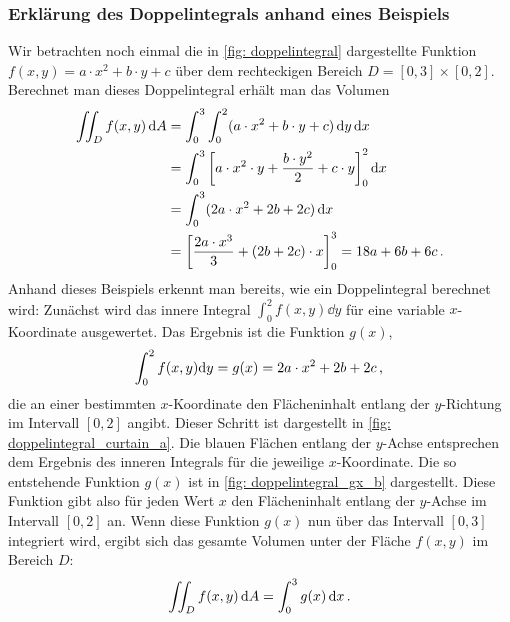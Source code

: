 \subsubsection{Erklärung des Doppelintegrals anhand eines Beispiels}\label{subsubsec: erklaerung_doppelintegral}
Wir betrachten noch einmal die in \cref{fig: doppelintegral} dargestellte Funktion $f(x,y) = a\cdot x^2 + b\cdot y + c$ über dem rechteckigen Bereich $D = [0,3] \times [0,2]$. Berechnet man dieses Doppelintegral erhält man das Volumen 
\begin{align*}
    \iint_{D} f(x,y) \,\mathrm{d} A &= \int_{0}^{3} \int_{0}^{2} (a\cdot x^2 + b\cdot y + c) \,\mathrm{d} y \,\mathrm{d} x \\
    &= \int_{0}^{3} \left[ a\cdot x^2 \cdot y + \frac{b\cdot y^2}{2} + c\cdot y \right]_{0}^{2} \mathrm{d} x \\
    &= \int_{0}^{3} (2a\cdot x^2 + 2b + 2c) \,\mathrm{d} x \\
    &= \left[ \frac{2a\cdot x^3}{3} + (2b + 2c)\cdot x \right]_{0}^{3} = 18a + 6b + 6c \,.
\end{align*}
Anhand dieses Beispiels erkennt man bereits, wie ein Doppelintegral berechnet wird: Zunächst wird das innere Integral $\int_{0}^{2} f(x,y) \dd y$ für eine variable $x$-Koordinate ausgewertet. Das Ergebnis ist die Funktion $g(x)$, 
\begin{equation}
    \int_{0}^{2} f(x,y) \mathrm{d} y = g(x) = 2a \cdot x^2 + 2b + 2c \,{,}\,
\end{equation} 
die an einer bestimmten $x$-Koordinate den Flächeninhalt entlang der $y$-Richtung im Intervall $[0,2]$ angibt. Dieser Schritt ist dargestellt in \cref{fig: doppelintegral_curtain_a}. Die blauen Flächen entlang der $y$-Achse entsprechen dem Ergebnis des inneren Integrals für die jeweilige $x$-Koordinate. Die so entstehende Funktion $g(x)$ ist in \cref{fig: doppelintegral_gx_b} dargestellt. Diese Funktion gibt also für jeden Wert $x$ den Flächeninhalt entlang der $y$-Achse im Intervall $[0,2]$ an. Wenn diese Funktion $g(x)$ nun über das Intervall $[0,3]$ integriert wird, ergibt sich das gesamte Volumen unter der Fläche $f(x,y)$ im Bereich $D$: 
\begin{equation}
    \iint_{D} f(x,y) \,\mathrm{d} A = \int_{0}^{3} g(x) \,\mathrm{d} x \,.
\end{equation}

